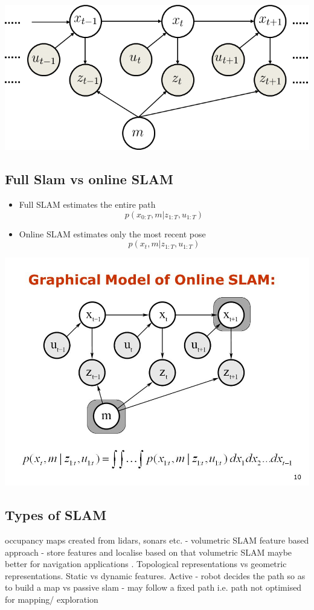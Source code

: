 \documentclass{article}
\begin{document}
\includegraphics[width = \linewidth]{graphical_model.png}
\subsection{Full Slam vs online SLAM}
    \begin{itemize}
        \item Full SLAM estimates the entire path $$p(x_{0:T},m|z_{1:T},u_{1:T})$$
        \item Online SLAM estimates only the most recent pose $$p(x_{t},m|z_{1:T},u_{1:T})$$
    \end{itemize}
\includegraphics[width = \linewidth]{online_SLAM.jpg}

\subsection{Types of SLAM}
    occupancy maps created from lidars, sonars etc. - volumetric SLAM
    feature based approach - store features and localise based on that 
    volumetric SLAM maybe  better for navigation applications . 
    Topological representations vs geometric representations.
    Static vs dynamic features.
    Active - robot decides the path so as to build a map vs passive slam -
    may follow a fixed path i.e. path not optimised for mapping/ exploration
\end{document}
